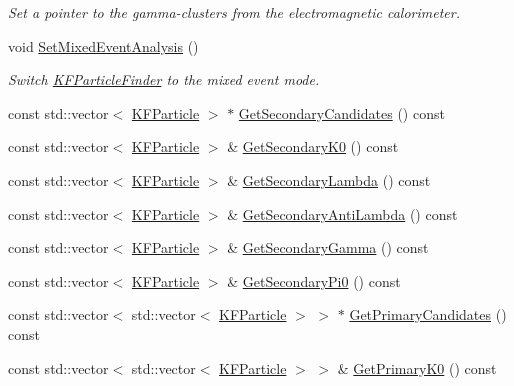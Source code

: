 \begin{DoxyCompactItemize}
\begin{DoxyCompactList}\small\item\em Set a pointer to the gamma-\/clusters from the electromagnetic calorimeter. \end{DoxyCompactList}\item 
void \hyperlink{classKFParticleFinder_a96545145ce1a922677fc9426d6b51c9e}{Set\+Mixed\+Event\+Analysis} ()\hypertarget{classKFParticleFinder_a96545145ce1a922677fc9426d6b51c9e}{}\label{classKFParticleFinder_a96545145ce1a922677fc9426d6b51c9e}

\begin{DoxyCompactList}\small\item\em Switch \hyperlink{classKFParticleFinder}{K\+F\+Particle\+Finder} to the mixed event mode. \end{DoxyCompactList}\item 
const std\+::vector$<$ \hyperlink{classKFParticle}{K\+F\+Particle} $>$ $\ast$ \hyperlink{classKFParticleFinder_a163cb839b90abc125f5526727724394c}{Get\+Secondary\+Candidates} () const 
\item 
const std\+::vector$<$ \hyperlink{classKFParticle}{K\+F\+Particle} $>$ \& \hyperlink{classKFParticleFinder_a6705d9f606d37159162fb7704650fe37}{Get\+Secondary\+K0} () const 
\item 
const std\+::vector$<$ \hyperlink{classKFParticle}{K\+F\+Particle} $>$ \& \hyperlink{classKFParticleFinder_a24decce5fe475853e057a0c8b5700ed4}{Get\+Secondary\+Lambda} () const 
\item 
const std\+::vector$<$ \hyperlink{classKFParticle}{K\+F\+Particle} $>$ \& \hyperlink{classKFParticleFinder_a35dd944121fa5e85bfd8e44cc2c24377}{Get\+Secondary\+Anti\+Lambda} () const 
\item 
const std\+::vector$<$ \hyperlink{classKFParticle}{K\+F\+Particle} $>$ \& \hyperlink{classKFParticleFinder_a737fcb30161664ef618f8ac2ba60244f}{Get\+Secondary\+Gamma} () const 
\item 
const std\+::vector$<$ \hyperlink{classKFParticle}{K\+F\+Particle} $>$ \& \hyperlink{classKFParticleFinder_aea096829eb0af2d898726c3275275327}{Get\+Secondary\+Pi0} () const 
\item 
const std\+::vector$<$ std\+::vector$<$ \hyperlink{classKFParticle}{K\+F\+Particle} $>$ $>$ $\ast$ \hyperlink{classKFParticleFinder_a09deaf59aac03e8a98fd690b4168e3f8}{Get\+Primary\+Candidates} () const 
\item 
const std\+::vector$<$ std\+::vector$<$ \hyperlink{classKFParticle}{K\+F\+Particle} $>$ $>$ \& \hyperlink{classKFParticleFinder_a273e44f0f353de890951e1e9227f9dda}{Get\+Primary\+K0} () const 

\end{DoxyCompactItemize}
